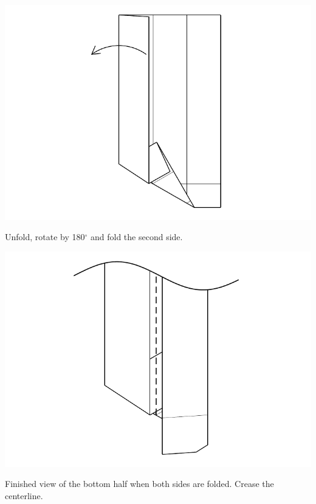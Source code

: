 \documentclass[11pt]{article}
\begin{document}
\begin{minipage}[t]{0.3\textwidth}
  \includegraphics[width=\textwidth]{../figs/fig06-07}
  \begin{itemize}{\item[7.] Unfold, rotate by 180$^\circ$ and fold the second side.}\end{itemize}
\end{minipage}
\begin{minipage}[t]{0.3\textwidth}
  \includegraphics[width=\textwidth]{../figs/fig06-08}
  \begin{itemize}{\item[8.] Finished view of the bottom half when both sides are folded.  Crease the centerline.}\end{itemize}
\end{minipage}
\end{document}
